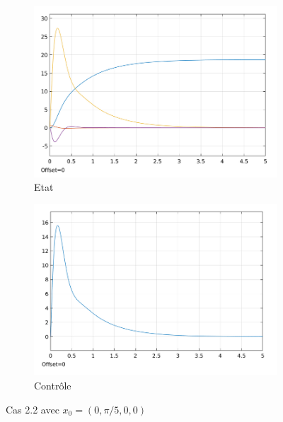 \documentclass[a4paper]{article}
\begin{document}
                        \begin{figure}[h!]
                                \centering
                                \begin{subfigure}[b]{0.45\textwidth}
                                        \includegraphics[width=\textwidth]{images/courbe_cas_2_2_TP03.png}
                                        \caption{Etat}
                                        \label{fig3.9.1}
                                \end{subfigure}
                                \hspace{30pt}
                                \begin{subfigure}[b]{0.45\textwidth}
                                        \includegraphics[width=\textwidth]{images/controle_cas_2_2_TP03.png}
                                        \caption{Contrôle}
                                        \label{fig3.9.2}
                                \end{subfigure}
                                \caption{Cas 2.2 avec $x_0=(0,\pi/5,0,0)$}
                                \label{fig3.9}
                        \end{figure}
                        \newpage
\end{document}
